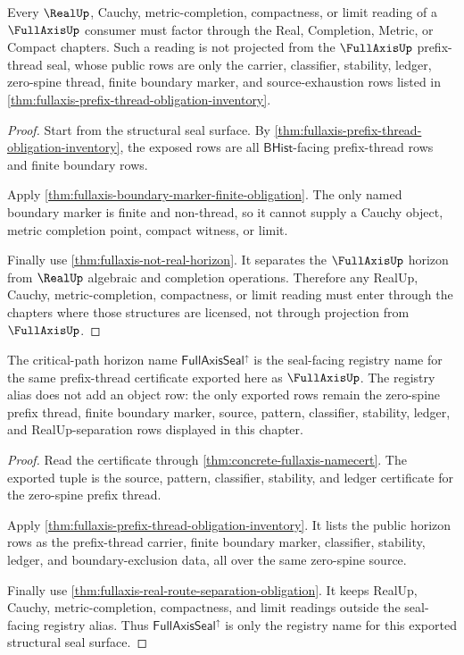 \begin{theorem}
\label{thm:fullaxis-real-route-separation-obligation}
Every $\RealUp$, Cauchy, metric-completion, compactness, or limit reading of a
$\FullAxisUp$ consumer must factor through the Real, Completion, Metric, or
Compact chapters. Such a reading is not projected from the $\FullAxisUp$
prefix-thread seal, whose public rows are only the carrier, classifier,
stability, ledger, zero-spine thread, finite boundary marker, and
source-exhaustion rows listed in
\autoref{thm:fullaxis-prefix-thread-obligation-inventory}.
\end{theorem}
\begin{proof}
Start from the structural seal surface. By
\autoref{thm:fullaxis-prefix-thread-obligation-inventory}, the exposed rows are
all $\mathsf{BHist}$-facing prefix-thread rows and finite boundary rows.

Apply \autoref{thm:fullaxis-boundary-marker-finite-obligation}. The only named
boundary marker is finite and non-thread, so it cannot supply a Cauchy object,
metric completion point, compact witness, or limit.

Finally use \autoref{thm:fullaxis-not-real-horizon}. It separates the
$\FullAxisUp$ horizon from $\RealUp$ algebraic and completion operations.
Therefore any RealUp, Cauchy, metric-completion, compactness, or limit reading
must enter through the chapters where those structures are licensed, not
through projection from $\FullAxisUp$.
\end{proof}

\begin{theorem}
\label{thm:fullaxis-seal-object-name-alignment}
The critical-path horizon name $\mathsf{FullAxisSeal}^{\uparrow}$ is the
seal-facing registry name for the same prefix-thread certificate exported here
as $\FullAxisUp$. The registry alias does not add an object row: the only
exported rows remain the zero-spine prefix thread, finite boundary marker,
source, pattern, classifier, stability, ledger, and RealUp-separation rows
displayed in this chapter.
\end{theorem}
\begin{proof}
Read the certificate through \autoref{thm:concrete-fullaxis-namecert}. The
exported tuple is the source, pattern, classifier, stability, and ledger
certificate for the zero-spine prefix thread.

Apply \autoref{thm:fullaxis-prefix-thread-obligation-inventory}. It lists the
public horizon rows as the prefix-thread carrier, finite boundary marker,
classifier, stability, ledger, and boundary-exclusion data, all over the same
zero-spine source.

Finally use \autoref{thm:fullaxis-real-route-separation-obligation}. It keeps
RealUp, Cauchy, metric-completion, compactness, and limit readings outside the
seal-facing registry alias. Thus $\mathsf{FullAxisSeal}^{\uparrow}$ is only the
registry name for this exported structural seal surface.
\end{proof}

